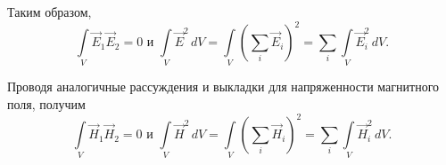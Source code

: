 Таким образом,
\[
    \int\limits_V \vec{E}_1\vec{E}_2 = 0 \text{ и }
    \int\limits_V \vec{E}^2\,dV = \int\limits_V \left(\sum_i\vec{E}_i\right)^2
    = \sum_i\int\limits_V \vec{E}_i^2\,dV.
\]

Проводя аналогичные рассуждения и выкладки для напряженности магнитного поля,
получим
\[
    \int\limits_V \vec{H}_1\vec{H}_2 = 0 \text{ и }
    \int\limits_V \vec{H}^2\,dV = \int\limits_V \left(\sum_i\vec{H}_i\right)^2
    = \sum_i\int\limits_V \vec{H}_i^2\,dV.
\]


